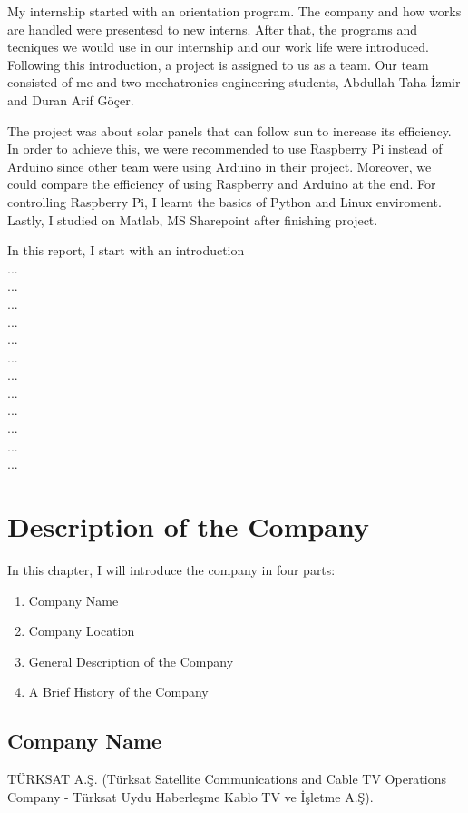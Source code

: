 	My internship started with an orientation program. The company and how works are handled were presentesd to new interns. After that, the programs and tecniques we would use in our internship and our work life were introduced.  
Following this introduction, a project is assigned to us as a team. Our team consisted of me and two mechatronics engineering students, Abdullah Taha İzmir and Duran Arif Göçer.  

	The project was about solar panels that can follow sun to increase its efficiency. In order to achieve this, we were recommended to use Raspberry Pi instead of Arduino since other team were using Arduino in their project. Moreover, we could compare the efficiency of using Raspberry and Arduino at the end. For controlling Raspberry Pi, I learnt the basics of Python and Linux enviroment. Lastly, I studied on Matlab, MS Sharepoint after finishing project.

	In this report, I start with an introduction  \\
	...  \\
	...  \\
	...  \\
	...  \\
	...  \\
	...  \\
	...  \\
	...  \\
	...  \\
	...  \\
	...  \\
	...  \\


\section{Description of the Company}
In this chapter, I will introduce the company in four parts:
\begin{enumerate}
\item Company Name
\item Company Location
\item General Description of the Company
\item A Brief History of the Company
\end{enumerate}


\subsection{Company Name}
\-
\indent TÜRKSAT A.Ş. (Türksat Satellite Communications and Cable TV Operations Company - Türksat Uydu Haberleşme Kablo TV ve İşletme A.Ş).


